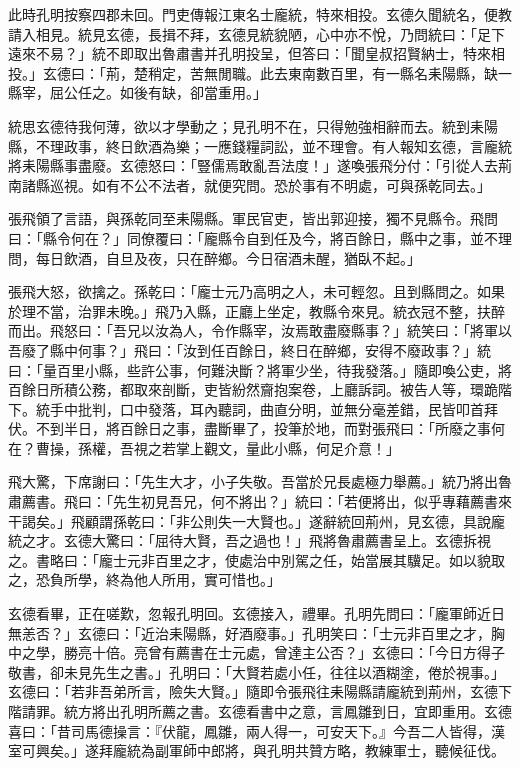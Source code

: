 此時孔明按察四郡未回。門吏傳報江東名士龐統，特來相投。玄德久聞統名，便教請入相見。統見玄德，長揖不拜，玄德見統貌陋，心中亦不悅，乃問統曰：「足下遠來不易？」統不即取出魯肅書并孔明投呈，但答曰：「聞皇叔招賢納士，特來相投。」玄德曰：「荊，楚稍定，苦無閒職。此去東南數百里，有一縣名耒陽縣，缺一縣宰，屈公任之。如後有缺，卻當重用。」

統思玄德待我何薄，欲以才學動之；見孔明不在，只得勉強相辭而去。統到耒陽縣，不理政事，終日飲酒為樂；一應錢糧詞訟，並不理會。有人報知玄德，言龐統將耒陽縣事盡廢。玄德怒曰：「豎儒焉敢亂吾法度！」遂喚張飛分付：「引從人去荊南諸縣巡視。如有不公不法者，就便究問。恐於事有不明處，可與孫乾同去。」

張飛領了言語，與孫乾同至耒陽縣。軍民官吏，皆出郭迎接，獨不見縣令。飛問曰：「縣令何在？」同僚覆曰：「龐縣令自到任及今，將百餘日，縣中之事，並不理問，每日飲酒，自旦及夜，只在醉鄉。今日宿酒未醒，猶臥不起。」

張飛大怒，欲擒之。孫乾曰：「龐士元乃高明之人，未可輕忽。且到縣問之。如果於理不當，治罪未晚。」飛乃入縣，正廳上坐定，教縣令來見。統衣冠不整，扶醉而出。飛怒曰：「吾兄以汝為人，令作縣宰，汝焉敢盡廢縣事？」統笑曰：「將軍以吾廢了縣中何事？」飛曰：「汝到任百餘日，終日在醉鄉，安得不廢政事？」統曰：「量百里小縣，些許公事，何難決斷？將軍少坐，待我發落。」隨即喚公吏，將百餘日所積公務，都取來剖斷，吏皆紛然齎抱案卷，上廳訴詞。被告人等，環跪階下。統手中批判，口中發落，耳內聽詞，曲直分明，並無分毫差錯，民皆叩首拜伏。不到半日，將百餘日之事，盡斷畢了，投筆於地，而對張飛曰：「所廢之事何在？曹操，孫權，吾視之若掌上觀文，量此小縣，何足介意！」

飛大驚，下席謝曰：「先生大才，小子失敬。吾當於兄長處極力舉薦。」統乃將出魯肅薦書。飛曰：「先生初見吾兄，何不將出？」統曰：「若便將出，似乎專藉薦書來干謁矣。」飛顧謂孫乾曰：「非公則失一大賢也。」遂辭統回荊州，見玄德，具說龐統之才。玄德大驚曰：「屈待大賢，吾之過也！」飛將魯肅薦書呈上。玄德拆視之。書略曰：「龐士元非百里之才，使處治中別駕之任，始當展其驥足。如以貌取之，恐負所學，終為他人所用，實可惜也。」

玄德看畢，正在嗟歎，忽報孔明回。玄德接入，禮畢。孔明先問曰：「龐軍師近日無恙否？」玄德曰：「近治耒陽縣，好酒廢事。」孔明笑曰：「士元非百里之才，胸中之學，勝亮十倍。亮曾有薦書在士元處，曾達主公否？」玄德曰：「今日方得子敬書，卻未見先生之書。」孔明曰：「大賢若處小任，往往以酒糊塗，倦於視事。」玄德曰：「若非吾弟所言，險失大賢。」隨即令張飛往耒陽縣請龐統到荊州，玄德下階請罪。統方將出孔明所薦之書。玄德看書中之意，言鳳雛到日，宜即重用。玄德喜曰：「昔司馬德操言：『伏龍，鳳雛，兩人得一，可安天下。』今吾二人皆得，漢室可興矣。」遂拜龐統為副軍師中郎將，與孔明共贊方略，教練軍士，聽候征伐。

